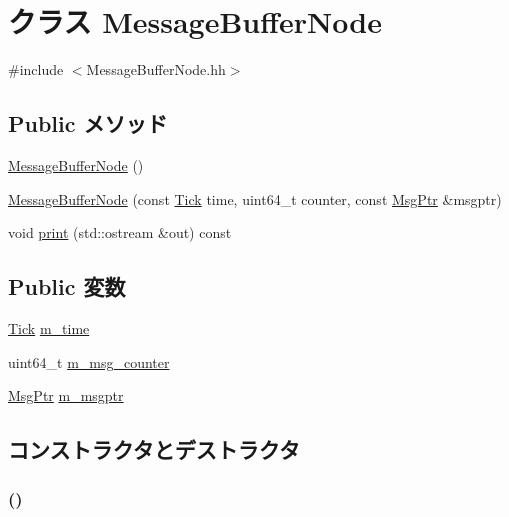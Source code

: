 \hypertarget{classMessageBufferNode}{
\section{クラス MessageBufferNode}
\label{classMessageBufferNode}
}


{\ttfamily \#include $<$MessageBufferNode.hh$>$}\subsection*{Public メソッド}
\begin{DoxyCompactItemize}
\item 
\hyperlink{classMessageBufferNode_a4df856dba29000a00d1c62a01dfcbfd0}{MessageBufferNode} ()
\item 
\hyperlink{classMessageBufferNode_a4656246025c0312a0be18a81a5ebaeb7}{MessageBufferNode} (const \hyperlink{base_2types_8hh_a5c8ed81b7d238c9083e1037ba6d61643}{Tick} time, uint64\_\-t counter, const \hyperlink{classRefCountingPtr}{MsgPtr} \&msgptr)
\item 
void \hyperlink{classMessageBufferNode_ac55fe386a101fbae38c716067c9966a0}{print} (std::ostream \&out) const 
\end{DoxyCompactItemize}
\subsection*{Public 変数}
\begin{DoxyCompactItemize}
\item 
\hyperlink{base_2types_8hh_a5c8ed81b7d238c9083e1037ba6d61643}{Tick} \hyperlink{classMessageBufferNode_adb6d90850c7a231a52313b5bc7e5df68}{m\_\-time}
\item 
uint64\_\-t \hyperlink{classMessageBufferNode_a3d60a9aaa917e449f52162fd0e6d3f25}{m\_\-msg\_\-counter}
\item 
\hyperlink{classRefCountingPtr}{MsgPtr} \hyperlink{classMessageBufferNode_a0190ebd96c557881596457a02c2f8743}{m\_\-msgptr}
\end{DoxyCompactItemize}


\subsection{コンストラクタとデストラクタ}
\hypertarget{classMessageBufferNode_a4df856dba29000a00d1c62a01dfcbfd0}{
\subsubsection[{MessageBufferNode}]{ ()}}
\label{classMessageBufferNode_a4df856dba29000a00d1c62a01dfcbfd0}



